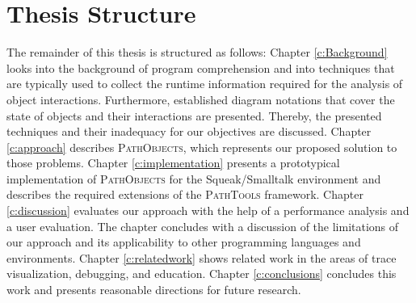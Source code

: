 \section{Thesis Structure}
The remainder of this thesis is structured as follows:
Chapter \ref{c:Background} looks into the background of program comprehension and into techniques that are typically used to collect the runtime information required for the analysis of object interactions.
Furthermore, established diagram notations that cover the state of objects and their interactions are presented.
Thereby, the presented techniques and their inadequacy for our objectives are discussed.
Chapter \ref{c:approach} describes \textsc{PathObjects}, which represents our proposed solution to those problems.
Chapter \ref{c:implementation} presents a prototypical implementation of \textsc{PathObjects} for the Squeak/Smalltalk environment and describes the required extensions of the \textsc{PathTools} framework.
Chapter \ref{c:discussion} evaluates our approach with the help of a performance analysis and a user evaluation. 
The chapter concludes with a discussion of the limitations of our approach and its applicability to other programming languages and environments.
Chapter \ref{c:relatedwork} shows related work in the areas of trace visualization, debugging, and education.
Chapter \ref{c:conclusions} concludes this work and presents reasonable directions for future research.